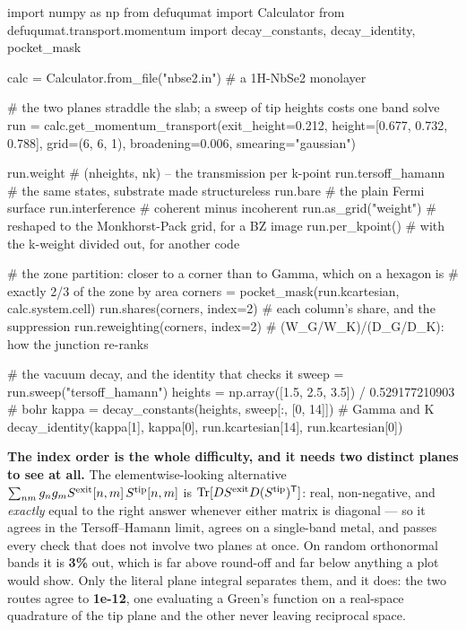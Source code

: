 \documentclass[11pt,a4paper]{article}
\begin{document}
\begin{pycode}
import numpy as np
from defuqumat import Calculator
from defuqumat.transport.momentum import decay_constants, decay_identity, pocket_mask

calc = Calculator.from_file("nbse2.in")          # a 1H-NbSe2 monolayer

# the two planes straddle the slab; a sweep of tip heights costs one band solve
run = calc.get_momentum_transport(exit_height=0.212, height=[0.677, 0.732, 0.788],
                                  grid=(6, 6, 1), broadening=0.006,
                                  smearing="gaussian")

run.weight            # (nheights, nk) -- the transmission per k-point
run.tersoff_hamann    # the same states, substrate made structureless
run.bare              # the plain Fermi surface
run.interference      # coherent minus incoherent
run.as_grid("weight") # reshaped to the Monkhorst-Pack grid, for a BZ image
run.per_kpoint()      # with the k-weight divided out, for another code

# the zone partition: closer to a corner than to Gamma, which on a hexagon is
# exactly 2/3 of the zone by area
corners = pocket_mask(run.kcartesian, calc.system.cell)
run.shares(corners, index=2)        # each column's share, and the suppression
run.reweighting(corners, index=2)   # (W_G/W_K)/(D_G/D_K): how the junction re-ranks

# the vacuum decay, and the identity that checks it
sweep = run.sweep("tersoff_hamann")
heights = np.array([1.5, 2.5, 3.5]) / 0.529177210903      # bohr
kappa = decay_constants(heights, sweep[:, [0, 14]])       # Gamma and K
decay_identity(kappa[1], kappa[0], run.kcartesian[14], run.kcartesian[0])
\end{pycode}

\textbf{The index order is the whole difficulty, and it needs two distinct
planes to see at all.} The elementwise-looking alternative
$\sum_{nm} g_n g_m S^{\rm exit}[n,m]\, S^{\rm tip}[n,m]$ is
$\mathrm{Tr}[D S^{\rm exit} D (S^{\rm tip})^{\mathsf T}]$: real, non-negative,
and \emph{exactly} equal to the right answer whenever either matrix is diagonal
--- so it agrees in the Tersoff--Hamann limit, agrees on a single-band metal,
and passes every check that does not involve two planes at once. On random
orthonormal bands it is \textbf{3\%} out, which is far above round-off and far
below anything a plot would show. Only the literal plane integral separates
them, and it does: the two routes agree to \textbf{1e-12}, one evaluating a
Green's function on a real-space quadrature of the tip plane and the other never
leaving reciprocal space.
\end{document}
